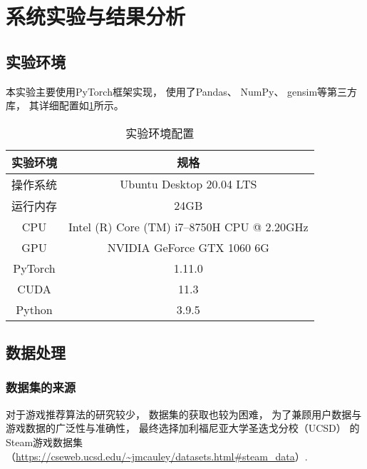 \section{系统实验与结果分析}

\subsection{实验环境}

本实验主要使用PyTorch框架实现，
使用了Pandas、
NumPy、
gensim等第三方库，
其详细配置如\cref{tb:device}所示。

\begin{table}[!htbp]
  \begin{center}
    \caption{实验环境配置}\label{tb:device}
    \begin{tabular}{cc}
      \toprule
      实验环境    & 规格                                          \\
      \midrule
      操作系统    & Ubuntu Desktop 20.04 LTS                    \\
      运行内存    & 24GB                                        \\
      CPU     & Intel (R) Core (TM) i7--8750H CPU @ 2.20GHz \\
      GPU     & NVIDIA GeForce GTX 1060 6G                  \\
      PyTorch & 1.11.0                                      \\
      CUDA    & 11.3                                        \\
      Python  & 3.9.5                                       \\
      \bottomrule
    \end{tabular}
  \end{center}
\end{table}

\subsection{数据处理}

\subsubsection{数据集的来源}

对于游戏推荐算法的研究较少，
数据集的获取也较为困难，
为了兼顾用户数据与游戏数据的广泛性与准确性，
最终选择加利福尼亚大学圣迭戈分校（UCSD）
的Steam游戏数据集
（\url{https://cseweb.ucsd.edu/~jmcauley/datasets.html#steam_data}）.

